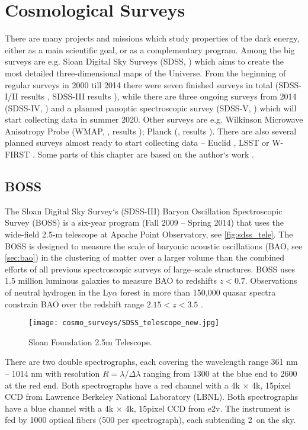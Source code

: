 \chapter{Cosmological Surveys}
\label{chpt:cosmo_surveys}
There are many projects and missions which study properties of the dark energy, either as a main scientific goal, or as a complementary program. Among the big surveys are e.g. Sloan Digital Sky Surveys (SDSS, \cite{SDSS}) which aims to create the most detailed three-dimensional maps of the Universe. From the beginning of regular surveys in 2000 till 2014 there were seven finished surveys in total (SDSS-I/II results \cite{SDSS_I_II}, SDSS-III results \cite{BOSS_results}), while there are three ongoing surveys from 2014 (SDSS-IV, \cite{2017AJ....154...28B}) and a planned panoptic spectroscopic survey (SDSS-V, \cite{2017arXiv171103234K}) which will start collecting data in summer 2020. Other surveys are e.g. Wilkinson Microwave Anisotropy Probe (WMAP, \cite{WMAP}, results \cite{WMAP_results}); Planck (\cite{planck}, results \cite{planck_cosm}). There are also several planned surveys almost ready to start collecting data -- Euclid \parencite{euclid}, LSST \parencite{lsst} or W-FIRST \parencite{WFIRST_report}. Some parts of this chapter are based on the author`s work \textcite{mastersthesis_vrastil}.
\section{BOSS}
The Sloan Digital Sky Survey`s (SDSS-III) Baryon Oscillation Spectroscopic Survey (BOSS) is a six-year program (Fall 2009 -- Spring 2014)  that uses the wide-field 2.5-m telescope at Apache Point Observatory, see \autoref{fig:sdss_tele}. The BOSS is designed to measure the scale of baryonic acoustic oscillations (BAO, see \autoref{sec:bao}) in the clustering of matter over a larger volume than the combined efforts of all previous spectroscopic surveys of large--scale structures. BOSS uses 1.5 million luminous galaxies to measure BAO to redshifts $z<0.7$. Observations of neutral hydrogen in the Ly$\alpha$ forest in more than 150,000 quasar spectra constrain BAO over the redshift range $2.15 < z < 3.5$ \cite{BOSS}.
\begin{figure}[tb]
    \centering
    \texttt{[image: cosmo\_surveys/SDSS\_telescope\_new.jpg]}
    \caption{Sloan Foundation 2.5m Telescope.}
    \label{fig:sdss_tele}
\end{figure}

There are two double spectrographs, each covering the wavelength range 361 nm -- 1014 nm with resolution $R=\lambda/\Delta\lambda$ ranging from 1300 at the blue end to 2600 at the red end.  Both spectrographs have a red channel with a 4k $\times$ 4k, 15\um  pixel CCD from Lawrence Berkeley National Laboratory (LBNL). Both spectrographs have a blue channel with a 4k $\times$ 4k, 15\um  pixel CCD from  e2v. The instrument is fed by 1000 optical fibers (500 per spectrograph), each subtending 2\arcsec\ on the sky.

